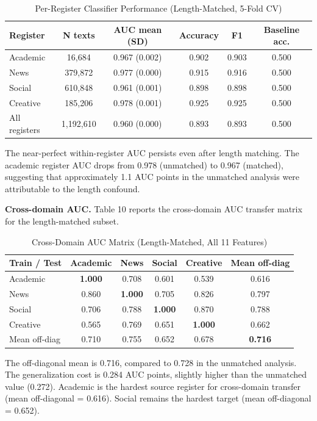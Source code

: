 \documentclass{article}
\begin{document}
\begin{table}[H]
\centering
\small
\begin{tabular}{lccccc}
\toprule
\textbf{Register} & \textbf{N texts} & \textbf{AUC mean (SD)} & \textbf{Accuracy} & \textbf{F1} & \textbf{Baseline acc.} \\
\midrule
Academic & 16,684 & 0.967 (0.002) & 0.902 & 0.903 & 0.500 \\
News & 379,872 & 0.977 (0.000) & 0.915 & 0.916 & 0.500 \\
Social & 610,848 & 0.961 (0.001) & 0.898 & 0.898 & 0.500 \\
Creative & 185,206 & 0.978 (0.001) & 0.925 & 0.925 & 0.500 \\
All registers & 1,192,610 & 0.960 (0.000) & 0.893 & 0.893 & 0.500 \\
\bottomrule
\end{tabular}
\caption{Per-Register Classifier Performance (Length-Matched, 5-Fold CV)}
\end{table}

The near-perfect within-register AUC persists even after length matching. The academic register AUC drops from 0.978 (unmatched) to 0.967 (matched), suggesting that approximately 1.1 AUC points in the unmatched analysis were attributable to the length confound.

\textbf{Cross-domain AUC.} Table 10 reports the cross-domain AUC transfer matrix for the length-matched subset.


\begin{table}[H]
\centering
\small
\begin{tabular}{lccccc}
\toprule
\textbf{Train / Test} & \textbf{Academic} & \textbf{News} & \textbf{Social} & \textbf{Creative} & \textbf{Mean off-diag} \\
\midrule
Academic & \textbf{1.000} & 0.708 & 0.601 & 0.539 & 0.616 \\
News & 0.860 & \textbf{1.000} & 0.705 & 0.826 & 0.797 \\
Social & 0.706 & 0.788 & \textbf{1.000} & 0.870 & 0.788 \\
Creative & 0.565 & 0.769 & 0.651 & \textbf{1.000} & 0.662 \\
Mean off-diag & 0.710 & 0.755 & 0.652 & 0.678 & \textbf{0.716} \\
\bottomrule
\end{tabular}
\caption{Cross-Domain AUC Matrix (Length-Matched, All 11 Features)}
\end{table}

The off-diagonal mean is 0.716, compared to 0.728 in the unmatched analysis. The generalization cost is 0.284 AUC points, slightly higher than the unmatched value (0.272). Academic is the hardest source register for cross-domain transfer (mean off-diagonal = 0.616). Social remains the hardest target (mean off-diagonal = 0.652).
\end{document}
